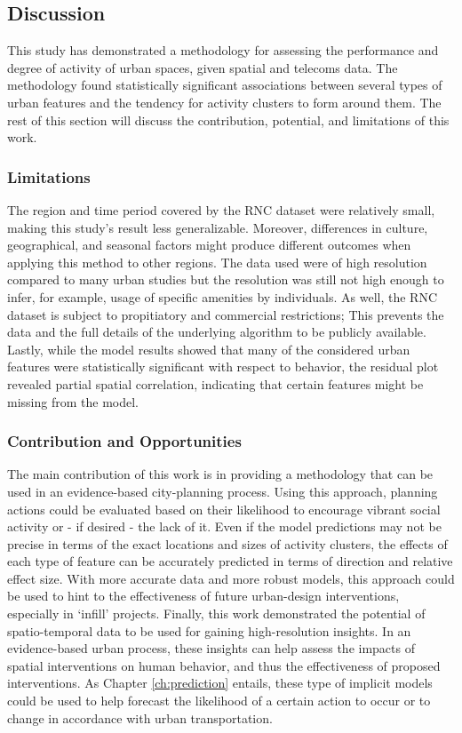\subsection{Discussion}
{
    This study has demonstrated a methodology for assessing the performance and degree of activity of urban spaces, given spatial and telecoms data. The methodology found statistically significant associations between several types of urban features and the tendency for activity clusters to form around them. The rest of this section will discuss the contribution, potential, and limitations of this work.

    \subsubsection{Limitations}
    {
        The region and time period covered by the RNC dataset were relatively small, making this study's result less generalizable. Moreover, differences in culture, geographical, and seasonal factors might produce different outcomes when applying this method to other regions. The data used were of high resolution compared to many urban studies \cite{Louail2014} but the resolution was still not high enough to infer, for example, usage of specific amenities by individuals. As well, the RNC dataset is subject to propitiatory and commercial restrictions; This prevents the data and the full details of the underlying algorithm to be publicly available. Lastly, while the model results showed that many of the considered urban features were statistically significant with respect to behavior, the residual plot revealed partial spatial correlation, indicating that certain features might be missing from the model.
    }

    \subsubsection{Contribution and Opportunities}

    {
        The main contribution of this work is in providing a methodology that can be used in an evidence-based city-planning process. Using this approach, planning actions could be evaluated based on their likelihood to encourage vibrant social activity or - if desired - the lack of it. Even if the model predictions may not be precise in terms of the exact locations and sizes of activity clusters, the effects of each type of feature can be accurately predicted in terms of direction and relative effect size. With more accurate data and more robust models, this approach could be used to hint to the effectiveness of future urban-design interventions, especially in `infill' projects.
        \newline
        Finally, this work demonstrated the potential of spatio-temporal data to be used for gaining high-resolution insights. In an evidence-based urban process, these insights can help assess the impacts of spatial interventions on human behavior, and thus the effectiveness of proposed interventions. As Chapter \eqref{ch:prediction} entails, these type of implicit models could be used to help forecast the likelihood of a certain action to occur or to change in accordance with urban transportation.
    }
}






